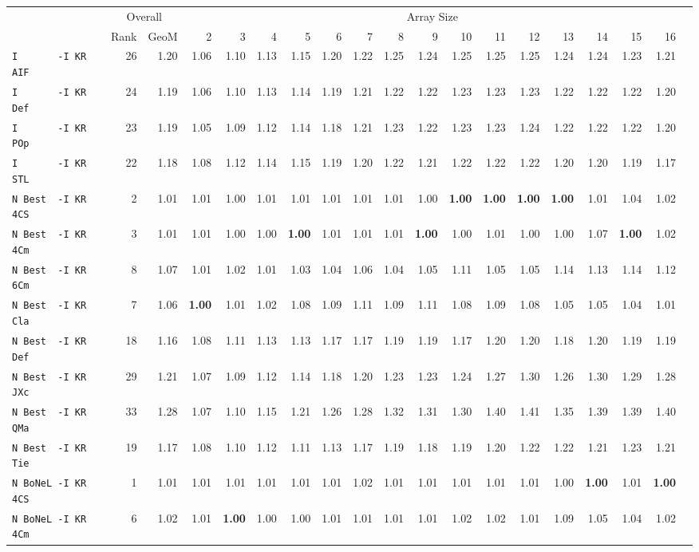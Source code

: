 \begin{tabular}{l | r @{~~} r | r@{~~}r@{~~}r@{~~}r@{~~}r@{~~}r@{~~}r@{~~}r@{~~}r@{~~}r@{~~}r@{~~}r@{~~}r@{~~}r@{~~}r@{~~}r|}
 & \multicolumn{2}{c}{Overall} & \multicolumn{15}{c}{Array Size} \\
 & Rank & GeoM & 2&3&4&5&6&7&8&9&10&11&12&13&14&15&16\\ \hline
\verb+I       -I KR AIF+ & 26 & 1.20 & 1.06&1.10&1.13&1.15&1.20&1.22&1.25&1.24&1.25&1.25&1.25&1.24&1.24&1.23&1.21\\
\verb+I       -I KR Def+ & 24 & 1.19 & 1.06&1.10&1.13&1.14&1.19&1.21&1.22&1.22&1.23&1.23&1.23&1.22&1.22&1.22&1.20\\
\verb+I       -I KR POp+ & 23 & 1.19 & 1.05&1.09&1.12&1.14&1.18&1.21&1.23&1.22&1.23&1.23&1.24&1.22&1.22&1.22&1.20\\
\verb+I       -I KR STL+ & 22 & 1.18 & 1.08&1.12&1.14&1.15&1.19&1.20&1.22&1.21&1.22&1.22&1.22&1.20&1.20&1.19&1.17\\
\verb+N Best  -I KR 4CS+ & 2 & 1.01 & 1.01&1.00&1.01&1.01&1.01&1.01&1.01&1.00&\textbf{1.00}&\textbf{1.00}&\textbf{1.00}&\textbf{1.00}&1.01&1.04&1.02\\
\verb+N Best  -I KR 4Cm+ & 3 & 1.01 & 1.01&1.00&1.00&\textbf{1.00}&1.01&1.01&1.01&\textbf{1.00}&1.00&1.01&1.00&1.00&1.07&\textbf{1.00}&1.02\\
\verb+N Best  -I KR 6Cm+ & 8 & 1.07 & 1.01&1.02&1.01&1.03&1.04&1.06&1.04&1.05&1.11&1.05&1.05&1.14&1.13&1.14&1.12\\
\verb+N Best  -I KR Cla+ & 7 & 1.06 & \textbf{1.00}&1.01&1.02&1.08&1.09&1.11&1.09&1.11&1.08&1.09&1.08&1.05&1.05&1.04&1.01\\
\verb+N Best  -I KR Def+ & 18 & 1.16 & 1.08&1.11&1.13&1.13&1.17&1.17&1.19&1.19&1.17&1.20&1.20&1.18&1.20&1.19&1.19\\
\verb+N Best  -I KR JXc+ & 29 & 1.21 & 1.07&1.09&1.12&1.14&1.18&1.20&1.23&1.23&1.24&1.27&1.30&1.26&1.30&1.29&1.28\\
\verb+N Best  -I KR QMa+ & 33 & 1.28 & 1.07&1.10&1.15&1.21&1.26&1.28&1.32&1.31&1.30&1.40&1.41&1.35&1.39&1.39&1.40\\
\verb+N Best  -I KR Tie+ & 19 & 1.17 & 1.08&1.10&1.12&1.11&1.13&1.17&1.19&1.18&1.19&1.20&1.22&1.22&1.21&1.23&1.21\\
\verb+N BoNeL -I KR 4CS+ & 1 & 1.01 & 1.01&1.01&1.01&1.01&1.01&1.02&1.01&1.01&1.01&1.01&1.01&1.00&\textbf{1.00}&1.01&\textbf{1.00}\\
\verb+N BoNeL -I KR 4Cm+ & 6 & 1.02 & 1.01&\textbf{1.00}&1.00&1.00&1.01&1.01&1.01&1.01&1.02&1.02&1.01&1.09&1.05&1.04&1.02\\

\end{tabular}
